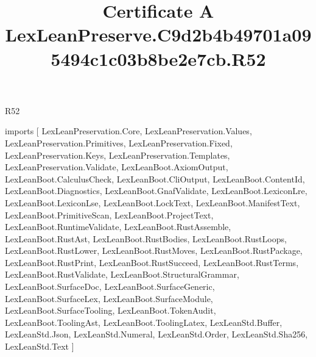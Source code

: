 \begin{lexlean}{R52}
\title{Certificate A LexLeanPreserve.C9d2b4b49701a095494c1c03b8be2e7cb.R52}
\begin{coremodule}
imports [
  LexLeanPreservation.Core,
  LexLeanPreservation.Values,
  LexLeanPreservation.Primitives,
  LexLeanPreservation.Fixed,
  LexLeanPreservation.Keys,
  LexLeanPreservation.Templates,
  LexLeanPreservation.Validate,
  LexLeanBoot.AxiomOutput,
  LexLeanBoot.CalculusCheck,
  LexLeanBoot.CliOutput,
  LexLeanBoot.ContentId,
  LexLeanBoot.Diagnostics,
  LexLeanBoot.GnafValidate,
  LexLeanBoot.LexiconLre,
  LexLeanBoot.LexiconLse,
  LexLeanBoot.LockText,
  LexLeanBoot.ManifestText,
  LexLeanBoot.PrimitiveScan,
  LexLeanBoot.ProjectText,
  LexLeanBoot.RuntimeValidate,
  LexLeanBoot.RustAssemble,
  LexLeanBoot.RustAst,
  LexLeanBoot.RustBodies,
  LexLeanBoot.RustLoops,
  LexLeanBoot.RustLower,
  LexLeanBoot.RustMoves,
  LexLeanBoot.RustPackage,
  LexLeanBoot.RustPrint,
  LexLeanBoot.RustSucceed,
  LexLeanBoot.RustTerms,
  LexLeanBoot.RustValidate,
  LexLeanBoot.StructuralGrammar,
  LexLeanBoot.SurfaceDoc,
  LexLeanBoot.SurfaceGeneric,
  LexLeanBoot.SurfaceLex,
  LexLeanBoot.SurfaceModule,
  LexLeanBoot.SurfaceTooling,
  LexLeanBoot.TokenAudit,
  LexLeanBoot.ToolingAst,
  LexLeanBoot.ToolingLatex,
  LexLeanStd.Buffer,
  LexLeanStd.Json,
  LexLeanStd.Numeral,
  LexLeanStd.Order,
  LexLeanStd.Sha256,
  LexLeanStd.Text
]


\end{coremodule}
\end{lexlean}
